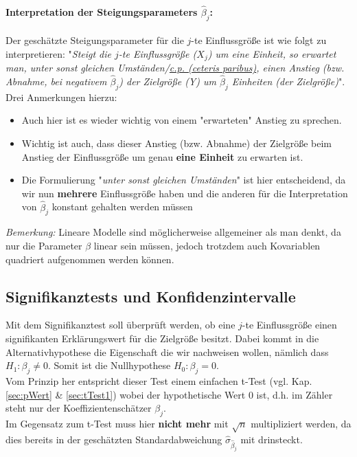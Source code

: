 \documentclass[a4paper]{article}
\newcommand\dangersign{%
 \makebox[1.8em][c]{%
 \makebox[0pt][c]{\raisebox{.15em}{\small!}}%
 \makebox[0pt][c]{\color{red}\Large$\triangle$}}}%
\begin{document}
\paragraph{Interpretation der Steigungsparameters $\hat \beta_j$:} Der geschätzte Steigungsparameter für die $j$-te Einflussgröße ist wie folgt zu interpretieren: "\textit{Steigt die $j$-te Einflussgröße ($X_j$) um eine Einheit, so erwartet man, unter sonst gleichen Umständen/\href{https://de.wikipedia.org/wiki/Ceteris_paribus}{c.p. (ceteris paribus)}, einen Anstieg (bzw. Abnahme, bei negativem $\hat \beta_j$) der Zielgröße (Y) um $\hat \beta_j$ Einheiten (der Zielgröße)}".\\
Drei Anmerkungen hierzu:
\begin{itemize}
    \item Auch hier ist es wieder wichtig von einem "erwarteten" Anstieg zu sprechen.
    \item Wichtig ist auch, dass dieser Anstieg (bzw. Abnahme) der Zielgröße beim Anstieg der Einflussgröße um genau \textbf{eine Einheit} zu erwarten ist.
    \item Die Formulierung "\textit{unter sonst gleichen Umständen}" ist hier entscheidend, da wir nun \textbf{mehrere} Einflussgröße haben und die anderen für die Interpretation von $\hat \beta_j$ konstant gehalten werden müssen
\end{itemize}

\noindent \dangersign \textit{Bemerkung:} Lineare Modelle sind möglicherweise allgemeiner als man denkt, da nur die Parameter $\beta$ linear sein müssen, jedoch trotzdem auch Kovariablen quadriert aufgenommen werden können.

\subsection{Signifikanztests und Konfidenzintervalle}
Mit dem Signifikanztest soll überprüft werden, ob eine $j$-te Einflussgröße einen signifikanten Erklärungswert für die Zielgröße besitzt. Dabei kommt in die Alternativhypothese die Eigenschaft die wir nachweisen wollen, nämlich dass $H_1: \beta_j \neq 0$. Somit ist die Nullhypothese $H_0:\beta_j=0$.\\
Vom Prinzip her entspricht dieser Test einem einfachen t-Test (vgl. Kap. \ref{sec:pWert} \& \ref{sec:tTest1}) wobei der hypothetische Wert 0 ist, d.h. im Zähler steht nur der Koeffizientenschätzer $\beta_j$.\\

\noindent \dangersign Im Gegensatz zum t-Test muss hier \textbf{nicht mehr} mit $\sqrt{n}$ multipliziert werden, da dies bereits in der geschätzten Standardabweichung $\hat \sigma_{\hat \beta_j}$ mit drinsteckt.\\
\end{document}
